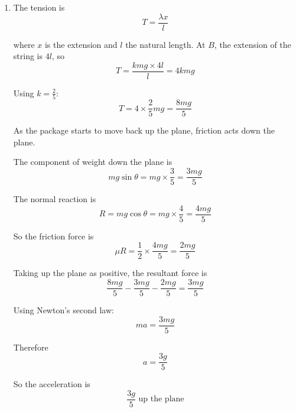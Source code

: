 \documentclass[leqno]{article}
\begin{document}
\begin{enumerate}[
  label=\textbf{\arabic*.},
  leftmargin=*,
  topsep=0pt,
  partopsep=0pt,
  parsep=0pt
]
\begin{djsSolution}
\begin{enumerate}[label=\textbf{(\alph*)}, start=1]
  So
  \[
  2mgl + \frac{2mgl}{5} = 6kmgl
  \]

  Hence
  \[
  \frac{12mgl}{5} = 6kmgl
  \]

  Dividing by $6mgl$ gives
  \[
  k=\frac25
  \]


  \item The tension is
  \[
  T=\frac{\lambda x}{l}
  \]

  where \(x\) is the extension and \(l\) the natural length. At $B$, the extension of the string is $4l$, so
  \[
  T=\frac{kmg\times 4l}{l} = 4kmg
  \]

  Using $k=\frac25$:
  \[
  T=4\times \frac25 mg = \frac{8mg}{5}
  \]

  As the package starts to move back up the plane, friction acts down the plane.

  The component of weight down the plane is
  \[
  mg\sin\theta = mg\times\frac35 = \frac{3mg}{5}
  \]

  The normal reaction is
  \[
  R = mg\cos\theta = mg\times\frac45 = \frac{4mg}{5}
  \]

  So the friction force is
  \[
  \mu R = \frac12\times\frac{4mg}{5} = \frac{2mg}{5}
  \]

  Taking up the plane as positive, the resultant force is
  \[
  \frac{8mg}{5} - \frac{3mg}{5} - \frac{2mg}{5} = \frac{3mg}{5}
  \]

  Using Newton's second law:
  \[
  ma = \frac{3mg}{5}
  \]

  Therefore
  \[
  a=\frac{3g}{5}
  \]

  So the acceleration is
  \[
  \frac{3g}{5}\text{ up the plane}
  \]
\end{enumerate}
\end{djsSolution}


\newpage

\questionitem

\begin{figure}[H]
    \centering
{}
\end{figure}
\end{enumerate}
\end{document}
